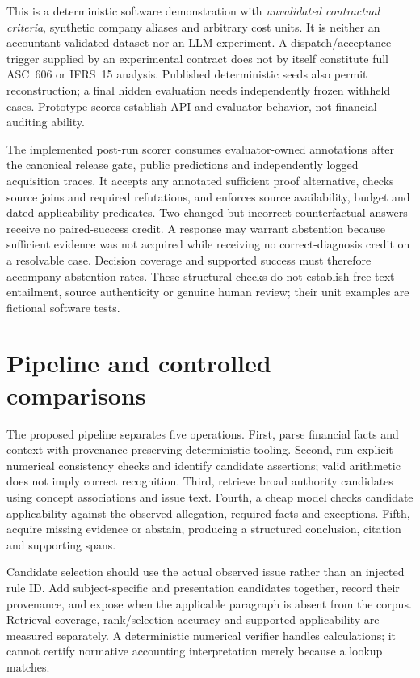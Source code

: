 \documentclass[11pt]{article}
\begin{document}
This is a deterministic software demonstration with \emph{unvalidated contractual criteria}, synthetic company aliases and arbitrary cost units. It is neither an accountant-validated dataset nor an LLM experiment. A dispatch/acceptance trigger supplied by an experimental contract does not by itself constitute full ASC~606 or IFRS~15 analysis. Published deterministic seeds also permit reconstruction; a final hidden evaluation needs independently frozen withheld cases. Prototype scores establish API and evaluator behavior, not financial auditing ability.

The implemented post-run scorer consumes evaluator-owned annotations after the canonical release gate, public predictions and independently logged acquisition traces. It accepts any annotated sufficient proof alternative, checks source joins and required refutations, and enforces source availability, budget and dated applicability predicates. Two changed but incorrect counterfactual answers receive no paired-success credit. A response may warrant abstention because sufficient evidence was not acquired while receiving no correct-diagnosis credit on a resolvable case. Decision coverage and supported success must therefore accompany abstention rates. These structural checks do not establish free-text entailment, source authenticity or genuine human review; their unit examples are fictional software tests.

\section{Pipeline and controlled comparisons}
The proposed pipeline separates five operations. First, parse financial facts and context with provenance-preserving deterministic tooling. Second, run explicit numerical consistency checks and identify candidate assertions; valid arithmetic does not imply correct recognition. Third, retrieve broad authority candidates using concept associations and issue text. Fourth, a cheap model checks candidate applicability against the observed allegation, required facts and exceptions. Fifth, acquire missing evidence or abstain, producing a structured conclusion, citation and supporting spans.

Candidate selection should use the actual observed issue rather than an injected rule ID. Add subject-specific and presentation candidates together, record their provenance, and expose when the applicable paragraph is absent from the corpus. Retrieval coverage, rank/selection accuracy and supported applicability are measured separately. A deterministic numerical verifier handles calculations; it cannot certify normative accounting interpretation merely because a lookup matches.
\end{document}
